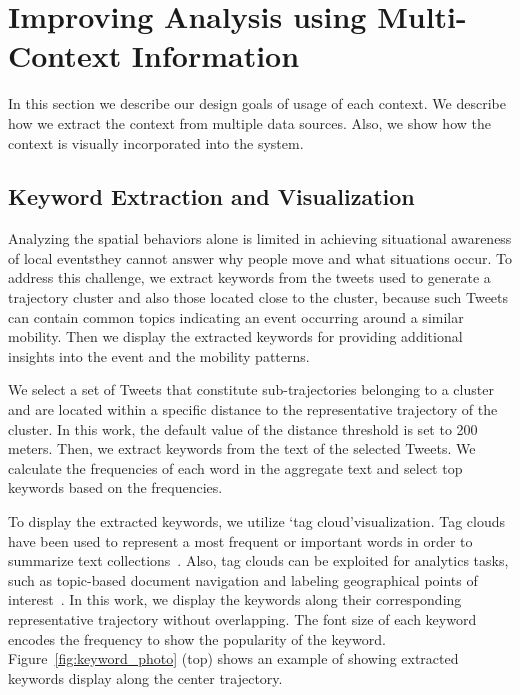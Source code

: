 \section{Improving Analysis using Multi-Context Information}
\label{sec:context}
In this section we describe our design goals of usage of each context.
We describe how we extract the context from multiple data sources.
Also, we show how the context is visually incorporated into the system.

\subsection{Keyword Extraction and Visualization}
Analyzing the spatial behaviors alone is limited in achieving situational awareness of local events\textemdash they cannot answer why people move and what situations occur.
To address this  challenge, we extract keywords from the tweets used to generate a trajectory cluster and also those located close to the cluster, because such Tweets can contain common topics indicating an event occurring around a similar mobility.
Then we display the extracted keywords for providing additional insights into the event and the mobility patterns.

We select a set of Tweets that constitute sub-trajectories belonging to a cluster and are located within a specific distance to the representative trajectory of the cluster.
In this work, the default value of the distance threshold is set to 200 meters.
Then, we extract keywords from the text of the selected Tweets.
We calculate the frequencies of each word in the aggregate text and select top keywords based on the frequencies.

To display the extracted keywords, we utilize \textquoteleft tag cloud\textquoteright visualization.
Tag clouds have been used to represent a most frequent or important words in order to summarize text collections~\cite{Viegas:2008:Timelines}.
Also, tag clouds can be exploited for analytics tasks, such as topic-based document navigation and labeling geographical points of interest~\cite{Thom:2012:SAD,Luboschik:2008:Particle}.
In this work, we display the keywords along their corresponding representative trajectory without overlapping.
The font size of each keyword encodes the frequency to show the popularity of the keyword.
Figure~\ref{fig:keyword_photo} (top) shows an example of showing extracted keywords display along the center trajectory. 

